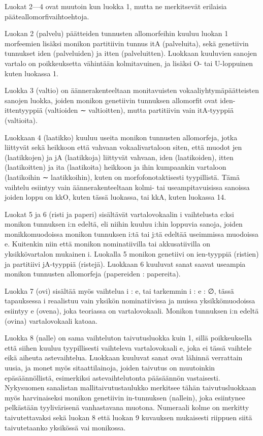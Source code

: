 \documentclass[free]{flammie}
\begin{document}
Luokat 2—4 ovat muutoin kun luokka 1, mutta ne merkitsevät erilaisia pääteallomorfivaihtoehtoja.

Luokan 2 (palvelu) päätteiden tunnusten allomorfeihin kuuluu luokan 1 morfeemien lisäksi monikon partitiivin tunnus itA (palveluita), sekä genetiivin tunnukset
iden (palveluiden) ja itten (palveluitten). Luokkaan kuuluvien sanojen vartalo on
poikkeuksetta vähintään kolmitavuinen, ja lisäksi O- tai U-loppuinen kuten luokassa 1.

Luokka 3 (valtio) on äännerakenteeltaan monitavuisten vokaaliyhtymäpäätteisten
sanojen luokka, joiden monikon genetiivin tunnuksen allomorfit ovat iden-ittentyyppiä (valtioiden ∼ valtioitten), mutta partitiivin vain itA-tyyppiä (valtioita).

Luokkaan 4 (laatikko) kuuluu useita monikon tunnusten allomorfeja, jotka liittyvät sekä heikkoon että vahvaan vokaalivartaloon siten, että muodot jen (laatikkojen) ja jA (laatikkoja) liittyvät vahvaan, iden (laatikoiden), itten (laatikoitten) ja ita (laatikoita) heikkoon ja
ihin kumpaankin vartaloon (laatikoihin ∼ laatikkoihin), kuten on morfofonotaktisesti tyypillistä. Tämä vaihtelu esiintyy vain äännerakenteeltaan kolmi- tai useampitavuisissa sanoissa joiden loppu on kkO, kuten tässä luokassa, tai kkA, kuten
luokassa 14.

Luokat 5 ja 6 (risti ja paperi) sisältävät vartalovokaalin i vaihtelusta e:ksi monikon tunnuksen i:n edeltä, eli niihin kuuluu i:hin loppuvia sanoja, joiden monikkomuodoissa monikon tunnuksen i:tä tai j:tä edeltää useimmissa muodoissa e.
Kuitenkin niin että monikon nominatiivilla tai akkusatiivilla on yksikkövartalon
mukainen i.
Luokalla 5 monikon genetiivi on ien-tyyppiä (ristien) ja partitiivi jA-tyyppiä (ristejä). Luokkaan 6 kuuluvat sanat saavat useampia monikon tunnusten allomorfeja
(papereiden : papereita).

Luokka 7 (ovi) sisältää myös vaihtelua i : e, tai tarkemmin i : e : ∅, tässä tapauksessa i reaalistuu vain yksikön nominatiivissa ja muissa yksikkömuodoissa
esiintyy e (ovena), joka teoriassa on vartalovokaali. Monikon tunnuksen i:n edeltä
(ovina) vartalovokaali katoaa.

Luokka 8 (nalle) on sama vaihteluton taivutusluokka kuin 1, sillä poikkeuksella että siihen kuuluu tyypillisesti vaihteleva vartalovokaali e, joka ei tässä vaihtele eikä aiheuta astevaihtelua. Luokkaan kuuluvat sanat ovat lähinnä verrattain
uusia, ja monet myös sitaattilainoja, joiden taivutus on muutoinkin epäsäännöllistä, esimerkiksi astevaihtelutonta pääsäännön vastaisesti. Nykysuomen sanalistan
mallitaivutustaulukko merkitsee tähän taivutusluokkaan myös harvinaiseksi monikon genetiivin in-tunnuksen (nallein), joka esiintynee pelkästään tyylivärisenä
vanhastavana muotona.
Numeraali kolme on merkitty taivutettavaksi sekä luokan 8 että luokan 9 kuvauksen mukaisesti riippuen siitä taivutetaanko yksikössä vai monikossa.
\end{document}
